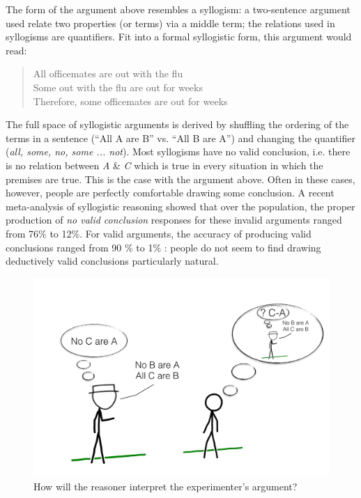\documentclass[10pt,letterpaper]{article}
\begin{document}
The form of the argument above resembles a syllogism: a two-sentence argument used relate two properties (or terms) via a middle term; the relations used in syllogisms are quantifiers. Fit into a formal syllogistic form, this argument would read:
\begin{quote}
All officemates are out with the flu\\
Some out with the flu are out for weeks\\
Therefore, some officemates are out for weeks
\end{quote}
The full space of syllogistic arguments is derived by shuffling the ordering of the terms in a sentence (``All A are B'' vs. ``All B are A'') and changing the quantifier (\emph{all, some, no, some ... not}). Most syllogisms have no valid conclusion, i.e. there is no relation between \emph{A} \& \emph{C} which is true in every situation in which the premises are true. This is the case with the argument above. Often in these cases, however, people are perfectly comfortable drawing some conclusion. A recent meta-analysis of syllogistic reasoning showed that over the population, the proper production of \emph{no valid conclusion} responses for these invalid arguments ranged from 76\% to 12\%. For valid arguments, the accuracy of producing valid conclusions ranged from 90 \% to 1\% \cite{Khemlani2012}: people do not seem to find drawing deductively valid conclusions particularly natural.
%
\begin{figure}
\centering
    \includegraphics[width=\columnwidth]{fig0_cartoon}
    \caption{How will the reasoner interpret the experimenter's argument?}
  \label{fig:xkcd}
\end{figure}
\end{document}
